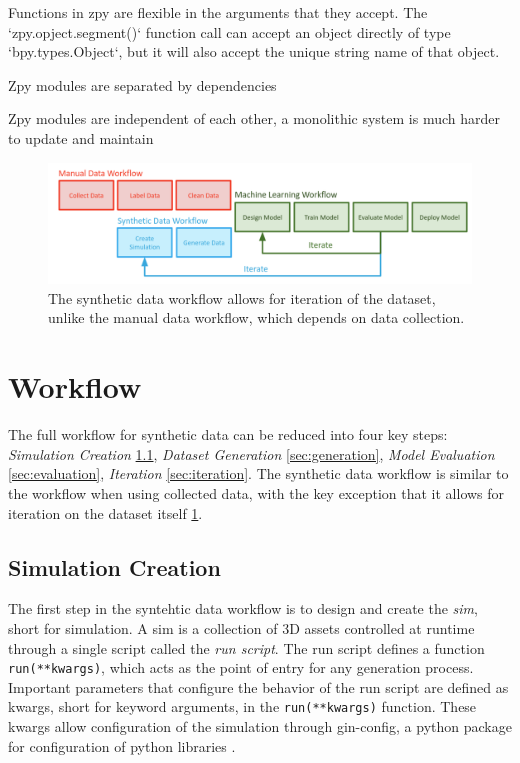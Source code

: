 \documentclass{article}
\begin{document}
Functions in zpy are flexible in the arguments that they accept. The `zpy.opject.segment()` function call can accept an object directly of type `bpy.types.Object`, but it will also accept the unique string name of that object. 

Zpy modules are separated by dependencies

Zpy modules are independent of each other, a monolithic system is much harder to update and maintain

\begin{figure}
	\centering
	\includegraphics[width=\textwidth]{workflow.png}
	\caption{The synthetic data workflow allows for iteration of the dataset, unlike the manual data workflow, which depends on data collection.}
	\label{fig:workflow}
\end{figure}

\section{Workflow}
\label{sec:workflow}

The full workflow for synthetic data can be reduced into four key steps: \emph{Simulation Creation} \ref{sec:worflowsimcreation}, \emph{Dataset Generation} \ref{sec:generation}, \emph{Model Evaluation} \ref{sec:evaluation}, \emph{Iteration} \ref{sec:iteration}. The synthetic data workflow is similar to the workflow when using collected data, with the key exception that it allows for iteration on the dataset itself \ref{fig:workflow}.

\subsection{Simulation Creation}
\label{sec:worflowsimcreation}

The first step in the syntehtic data workflow is to design and create the \emph{sim}, short for simulation. A sim is a collection of 3D assets controlled at runtime through a single script called the \emph{run script}. The run script defines a function \lstinline{run(**kwargs)}, which acts as the point of entry for any generation process. Important parameters that configure the behavior of the run script are defined as kwargs, short for keyword arguments, in the \lstinline{run(**kwargs)} function. These kwargs allow configuration of the simulation through gin-config, a python package for configuration of python libraries \citep{ginconfig}.
\end{document}
